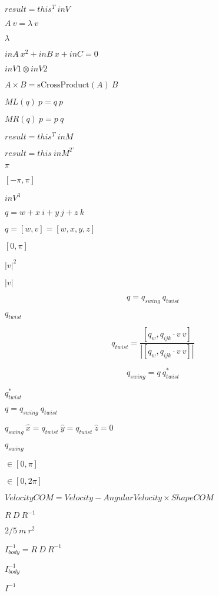 \documentclass{article}
\begin{document}
$result = this^T \: inV$
\pagebreak

$A \: v = \lambda \: v$
\pagebreak

$\lambda$
\pagebreak

$inA \: x^2 + inB \: x + inC = 0$
\pagebreak

$inV1 \otimes inV2$
\pagebreak

$A \times B = \text{sCrossProduct}(A) \: B$
\pagebreak

$ML(q) \: p = q \: p$
\pagebreak

$MR(q) \: p = p \: q$
\pagebreak

$result = this^T \: inM$
\pagebreak

$result = this \: inM^T$
\pagebreak

$\pi$
\pagebreak

$[-\pi, \pi]$
\pagebreak

$inV^3$
\pagebreak

$q = w + x \: i + y \: j + z \: k$
\pagebreak

$q = [w, v] = [w, x, y, z]$
\pagebreak

$[0, \pi]$
\pagebreak

$|v|^2$
\pagebreak

$|v|$
\pagebreak

\[q = q_{swing} \: q_{twist}\]
\pagebreak

$q_{twist}$
\pagebreak

\[q_{twist} = \frac{[q_w, q_{ijk} \cdot v \: v]}{\left|[q_w, q_{ijk} \cdot v \: v]\right|}\]
\pagebreak

\[q_{swing} = q \: q_{twist}^* \]
\pagebreak

$q_{twist}^*$
\pagebreak

$q = q_{swing} \: q_{twist}$
\pagebreak

$q_{swing} \: \hat{x} = q_{twist} \: \hat{y} = q_{twist} \: \hat{z} = 0$
\pagebreak

$q_{swing}$
\pagebreak

$\in [0, \pi]$
\pagebreak

$\in [0, 2 \pi]$
\pagebreak

$VelocityCOM = Velocity - AngularVelocity \times ShapeCOM$
\pagebreak

$R \: D \: R^{-1}$
\pagebreak

$2/5 \: m \: r^2$
\pagebreak

$I_{body}^{-1} = R \: D \: R^{-1}$
\pagebreak

$I_{body}^{-1}$
\pagebreak

$I^{-1}$
\pagebreak
\end{document}
